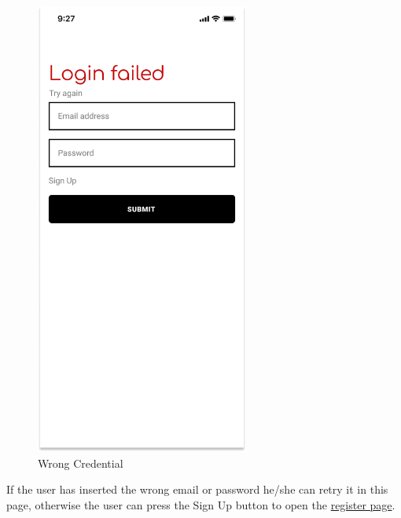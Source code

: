\begin{figure}[H]
    \centering
    \includegraphics[keepaspectratio, height=15cm]{AppInterface/Failed Login.png}
    \caption{Wrong Credential}
    \label{fig:FailedLogin}
\end{figure}
If the user has inserted the wrong email or password he/she can retry it in this page, otherwise the user can press the Sign Up button to open the \hyperref[fig:Register]{register page}.


